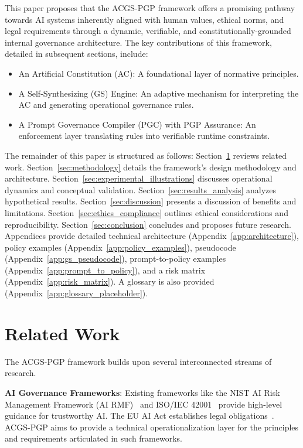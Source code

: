 \documentclass[sigconf,review,anonymous=false]{acmart} %
\begin{document}
This paper proposes that the ACGS-PGP framework offers a promising pathway towards AI systems inherently aligned with human values, ethical norms, and legal requirements through a dynamic, verifiable, and constitutionally-grounded internal governance architecture. The key contributions of this framework, detailed in subsequent sections, include:
\begin{itemize}
    \item An Artificial Constitution (AC): A foundational layer of normative principles.
    \item A Self-Synthesizing (GS) Engine: An adaptive mechanism for interpreting the AC and generating operational governance rules.
    \item A Prompt Governance Compiler (PGC) with PGP Assurance: An enforcement layer translating rules into verifiable runtime constraints.
\end{itemize}

The remainder of this paper is structured as follows: Section~\ref{sec:related_work} reviews related work. Section~\ref{sec:methodology} details the framework's design methodology and architecture. Section~\ref{sec:experimental_illustrations} discusses operational dynamics and conceptual validation. Section~\ref{sec:results_analysis} analyzes hypothetical results. Section~\ref{sec:discussion} presents a discussion of benefits and limitations. Section~\ref{sec:ethics_compliance} outlines ethical considerations and reproducibility. Section~\ref{sec:conclusion} concludes and proposes future research. Appendices provide detailed technical architecture (Appendix~\ref{app:architecture}), policy examples (Appendix~\ref{app:policy_examples}), pseudocode (Appendix~\ref{app:gs_pseudocode}), prompt-to-policy examples (Appendix~\ref{app:prompt_to_policy}), and a risk matrix (Appendix~\ref{app:risk_matrix}). A glossary is also provided (Appendix~\ref{app:glossary_placeholder}).

\section{Related Work}
\label{sec:related_work}
The ACGS-PGP framework builds upon several interconnected streams of research.

\textbf{AI Governance Frameworks}: Existing frameworks like the NIST AI Risk Management Framework (AI RMF)~\cite{NISTAIRMF23} and ISO/IEC 42001~\cite{KPMGISO42001} provide high-level guidance for trustworthy AI. The EU AI Act establishes legal obligations~\cite{EUAIAct24}. ACGS-PGP aims to provide a technical operationalization layer for the principles and requirements articulated in such frameworks.
\end{document}
